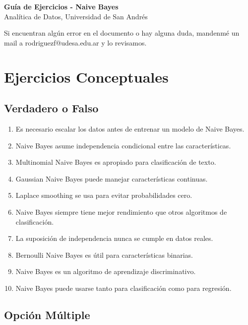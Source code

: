 \documentclass[12pt]{article}
\begin{document}
\begin{center}
  {\LARGE \textbf{Guía de Ejercicios - Naive Bayes}}\\[0.5em]
  {Analítica de Datos, Universidad de San Andrés}
\end{center}

Si encuentran algún error en el documento o hay alguna duda, mandenmé un mail a rodriguezf@udesa.edu.ar y lo revisamos.

\section{Ejercicios Conceptuales}

\subsection{Verdadero o Falso}

\begin{enumerate}
    \item Es necesario escalar los datos antes de entrenar un modelo de Naive Bayes.
    \item Naive Bayes asume independencia condicional entre las características.
    \item Multinomial Naive Bayes es apropiado para clasificación de texto.
    \item Gaussian Naive Bayes puede manejar características continuas.
    \item Laplace smoothing se usa para evitar probabilidades cero.
    \item Naive Bayes siempre tiene mejor rendimiento que otros algoritmos de clasificación.
    \item La suposición de independencia nunca se cumple en datos reales.
    \item Bernoulli Naive Bayes es útil para características binarias.
    \item Naive Bayes es un algoritmo de aprendizaje discriminativo.
    \item Naive Bayes puede usarse tanto para clasificación como para regresión.
\end{enumerate}

\subsection{Opción Múltiple}
\end{document}
